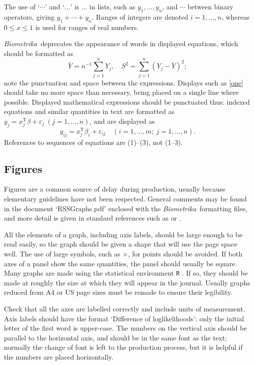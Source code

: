 \documentclass[supplementary,lineno]{biometrika}
\def\Bka{{\it Biometrika}}
\def\T{{ \mathrm{\scriptscriptstyle T} }}
\def\v{{\varepsilon}}
\begin{document}
The use of `$\cdots$' and `$\ldots$' is  $\ldots$ in lists, such as $y_1,\ldots,y_n$, and $\cdots$ between binary operators,  giving $y_1+\cdots+y_n$.
Ranges of integers are denoted $i=1,\ldots, n$, whereas $0\leq x\leq 1$ is used for ranges of real numbers.  %

\Bka\ deprecates the appearance of words in displayed equations, which should be formatted as
\begin{equation}
\label{one}
\bar Y = n^{-1} \sum_{j=1}^n Y_j,\quad S^2 = \sum_{j=1}^n (Y_j-\bar Y)^2;
\end{equation}
note the punctuation and space between the expressions. Displays such as \eqref{one} should take no more space than necessary, being placed on a single line where possible.  Displayed mathematical expressions should be punctuated thus: indexed equations and similar quantities in text are formatted as
$y_j = x_j^\T\beta + \v_j\ (j=1,\ldots, n)$, and are displayed as
\[
y_{ij} = x_j^\T\beta_i + \v_{ij}\quad (i=1,\ldots, m;\ j=1,\ldots, n).
\]
References to sequences of equations are (1)--(3), not (1--3).

\subsection{Figures}

Figures are a common source of delay during production, usually because elementary guidelines have not been respected.  General comments may be found in the document `RSSGraphs.pdf' enclosed with the \Bka\ formatting files, and more detail is given in standard references such as \citet{Cleveland:1993,Cleveland:1994} or \citet{Tufte:1983}.

All the elements of a graph, including axis labels, should be large enough to be read easily, so the graph should be given a shape that will use the page space well. The use of large symbols, such as $\times$, for points should be avoided. If both axes of a panel show the same quantities, the panel should usually be square.  Many graphs are made using the statistical environment \texttt{R} \citep{R:2010}.  If so, they should be made at roughly the size at which they will appear in the journal.  Usually graphs reduced from A4 or US page sizes must be remade to ensure their legibility.

Check that all the axes are labelled correctly and include units of measurement.  Axis labels should have the format `Difference of loglikelihoods': only the initial letter of the first word is upper-case.
The numbers on the vertical axis should be parallel to the horizontal axis, and should be in the same font as the text; normally the change of font is left to the production process, but it is helpful if the numbers are placed horizontally.
\end{document}
